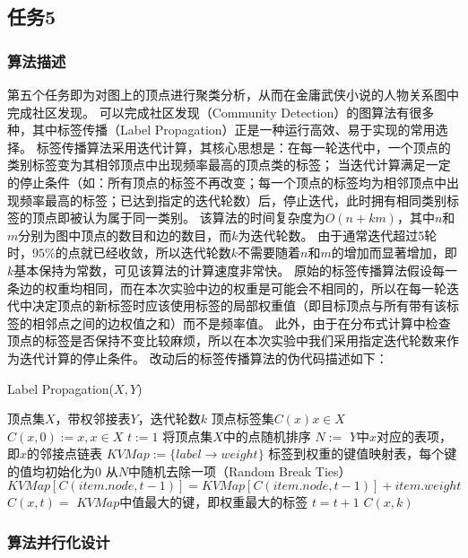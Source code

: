 \subsection{任务5}

\subsubsection{算法描述}
第五个任务即为对图上的顶点进行聚类分析，从而在金庸武侠小说的人物关系图中完成社区发现。
可以完成社区发现（Community Detection）的图算法有很多种，其中标签传播（Label Propagation）正是一种运行高效、易于实现的常用选择。
标签传播算法采用迭代计算，其核心思想是：在每一轮迭代中，一个顶点的类别标签变为其相邻顶点中出现频率最高的顶点类的标签；
当迭代计算满足一定的停止条件（如：所有顶点的标签不再改变；每一个顶点的标签均为相邻顶点中出现频率最高的标签；已达到指定的迭代轮数）后，停止迭代，此时拥有相同类别标签的顶点即被认为属于同一类别。
该算法的时间复杂度为$O(n+km)$，其中$n$和$m$分别为图中顶点的数目和边的数目，而$k$为迭代轮数。
由于通常迭代超过5轮时，$95\%$的点就已经收敛，所以迭代轮数$k$不需要随着$n$和$m$的增加而显著增加，即$k$基本保持为常数，可见该算法的计算速度非常快。
原始的标签传播算法假设每一条边的权重均相同，而在本次实验中边的权重是可能会不相同的，所以在每一轮迭代中决定顶点的新标签时应该使用标签的局部权重值（即目标顶点与所有带有该标签的相邻点之间的边权值之和）而不是频率值。
此外，由于在分布式计算中检查顶点的标签是否保持不变比较麻烦，所以在本次实验中我们采用指定迭代轮数来作为迭代计算的停止条件。
改动后的标签传播算法的伪代码描述如下：
\begin{algorithm}[H]
    \caption{Label Propagation($X,Y$)}
    \begin{algorithmic}[1]
        \REQUIRE 顶点集$X$，带权邻接表$Y$，迭代轮数$k$
        \ENSURE 顶点标签集$C(x) x \in X$
        \STATE $C(x, 0) := x, x \in X$
        \STATE $t := 1$
        \STATE 将顶点集$X$中的点随机排序
        \STATE $N :=$ $Y$中$x$对应的表项，即$x$的邻接点链表
        \STATE $KVMap := \{label \rightarrow weight\}$ 标签到权重的键值映射表，每个键的值均初始化为0
        \STATE 从$N$中随机去除一项（Random Break Ties）
        \STATE $KVMap[C(item.node, t-1)] = KVMap[C(item.node, t-1)] + item.weight$
        \ENDFOR
        \STATE $C(x, t) =$ $KVMap$中值最大的键，即权重最大的标签
        \ENDFOR
        \STATE $t = t + 1$
        \ENDFOR
        \RETURN $C(x, k)$
    \end{algorithmic}
\end{algorithm}

\subsubsection{算法并行化设计}